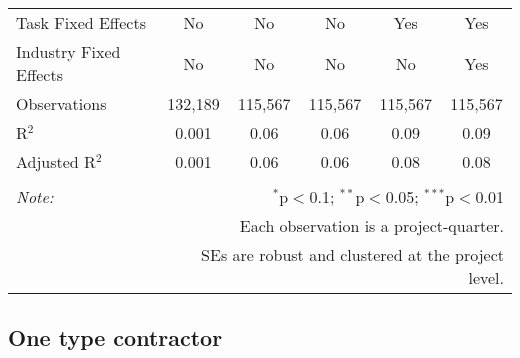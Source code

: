 \documentclass[
]{article}
\begin{document}
\begin{table}[H]
\begin{tabular}{@{\extracolsep{-2pt}}lccccc}
Task Fixed Effects & No & No & No & Yes & Yes \\ 
Industry Fixed Effects & No & No & No & No & Yes \\ 
Observations & 132,189 & 115,567 & 115,567 & 115,567 & 115,567 \\ 
R$^{2}$ & 0.001 & 0.06 & 0.06 & 0.09 & 0.09 \\ 
Adjusted R$^{2}$ & 0.001 & 0.06 & 0.06 & 0.08 & 0.08 \\ 
\hline 
\hline \\[-1.8ex] 
\textit{Note:}  & \multicolumn{5}{r}{$^{*}$p$<$0.1; $^{**}$p$<$0.05; $^{***}$p$<$0.01} \\ 
 & \multicolumn{5}{r}{Each observation is a project-quarter.} \\ 
 & \multicolumn{5}{r}{SEs are robust and clustered at the project level.} \\ 
\end{tabular} 
\end{table}

\hypertarget{one-type-contractor}{%
\subsection{One type contractor}\label{one-type-contractor}}
\end{document}

